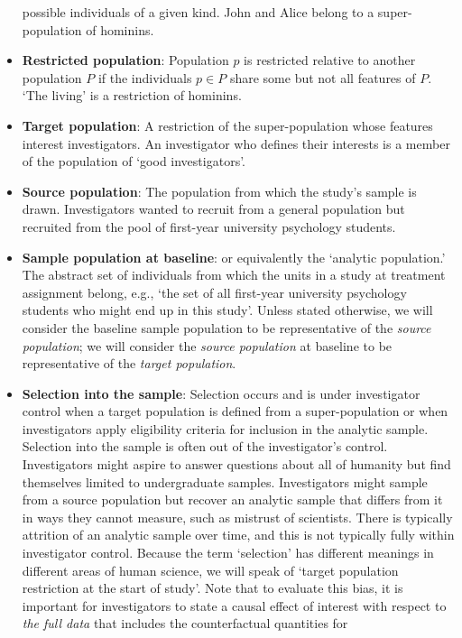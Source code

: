 \documentclass[
  single column]{article}
\begin{document}
\begin{itemize}
  possible individuals of a given kind. John and Alice belong to a
  super-population of hominins.
\item
  \textbf{Restricted population}: Population \(p\) is restricted
  relative to another population \(P\) if the individuals \(p \in P\)
  share some but not all features of \(P\). `The living' is a
  restriction of hominins.
\item
  \textbf{Target population}: A restriction of the super-population
  whose features interest investigators. An investigator who defines
  their interests is a member of the population of `good investigators'.
\item
  \textbf{Source population}: The population from which the study's
  sample is drawn. Investigators wanted to recruit from a general
  population but recruited from the pool of first-year university
  psychology students.
\item
  \textbf{Sample population at baseline}: or equivalently the `analytic
  population.' The abstract set of individuals from which the units in a
  study at treatment assignment belong, e.g., `the set of all first-year
  university psychology students who might end up in this study'. Unless
  stated otherwise, we will consider the baseline sample population to
  be representative of the \emph{source population}; we will consider
  the \emph{source population} at baseline to be representative of the
  \emph{target population}.
\item
  \textbf{Selection into the sample}: Selection occurs and is under
  investigator control when a target population is defined from a
  super-population or when investigators apply eligibility criteria for
  inclusion in the analytic sample. Selection into the sample is often
  out of the investigator's control. Investigators might aspire to
  answer questions about all of humanity but find themselves limited to
  undergraduate samples. Investigators might sample from a source
  population but recover an analytic sample that differs from it in ways
  they cannot measure, such as mistrust of scientists. There is
  typically attrition of an analytic sample over time, and this is not
  typically fully within investigator control. Because the term
  `selection' has different meanings in different areas of human
  science, we will speak of `target population restriction at the start
  of study'. Note that to evaluate this bias, it is important for
  investigators to state a causal effect of interest with respect to
  \emph{the full data} that includes the counterfactual quantities for

\end{itemize}
\end{document}
